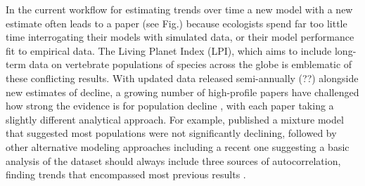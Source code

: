 \documentclass[11pt]{article}
\begin{document}
\begin{tcolorbox}
{\begin{multicols}{2}
In the current workflow for estimating trends over time a new model with a new estimate often leads to a paper (see Fig.) because ecologists spend far too little time interrogating their models with simulated data, or their model performance fit to empirical data. 
The Living Planet Index (LPI), which aims to include long-term data on vertebrate populations of species across the globe is emblematic of these conflicting results. With updated data released semi-annually (??) alongside new estimates of decline, a growing number of high-profile papers have challenged how strong the evidence is for population decline \citep{Dornelas2014,gonzalez2016estimating,wagner2021insect,muller2024weather}, with each paper taking a slightly different analytical approach. For example, \citet{Leung2020} published a mixture model that suggested most populations were not significantly declining, followed by other alternative modeling approaches \citep{Buschke2021,puurtinen2022living} including a recent one suggesting a basic analysis of the dataset should always include three sources of autocorrelation, finding trends that encompassed most previous results \citep{Johnson2024}. 


\end{multicols}}
\end{tcolorbox}
\end{document}
